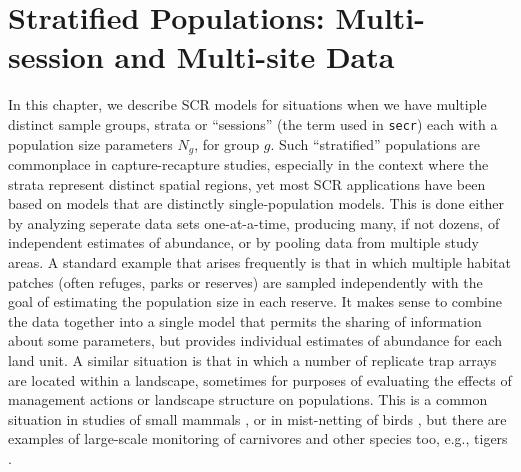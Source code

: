 \chapter{Stratified Populations:
Multi-session and Multi-site Data}
\label{chapt.hscr}

\vspace{0.3cm}


In this chapter, we describe SCR models for situations when we have
multiple distinct sample groups, strata or ``sessions'' (the term used
in \mbox{\tt secr}) each with a population size parameters $N_{g}$, for
group $g$.
Such ``stratified'' populations are commonplace in capture-recapture
studies, especially in the context where the strata represent
distinct spatial regions, yet most SCR applications have been based
 on models that are distinctly single-population models. This is done
 either by analyzing seperate data sets one-at-a-time, producing many,
 if not dozens, of independent estimates of abundance, or by pooling
 data from multiple study areas.  A standard example that arises
frequently is that in which multiple habitat patches (often refuges,
parks or reserves) are sampled independently with the goal of
estimating the population size in each reserve. It makes sense to
combine the data together into a single model that permits the
sharing of information about some parameters, but provides individual
estimates of abundance for each land unit.  A similar situation is
that in which a number of replicate trap arrays are located within a
landscape, sometimes for purposes of evaluating the effects of
management actions or landscape structure on populations. This is a
common situation in studies of small mammals
 \citep{converse_etal:2006jwm, converse_etal:2006ea,
   converse_royle:2012}, or in mist-netting of birds
 \citep{desante_etal:1995},
but there are examples of large-scale monitoring of carnivores and
other species too, e.g., tigers \citep{jhala_etal:2011}.


